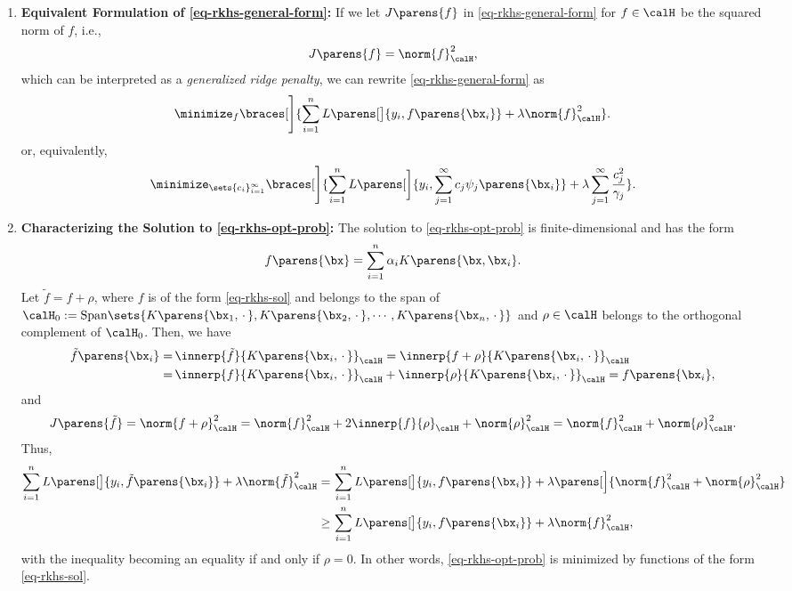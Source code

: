 \documentclass[12pt]{article}
\begin{document}
\begin{enumerate}[label=\textbf{\arabic*.}]
	\item \textbf{Equivalent Formulation of \eqref{eq-rkhs-general-form}:} If we let $J \parens{f}$ in \eqref{eq-rkhs-general-form} for $f \in \calH$ be the squared norm of $f$, i.e., 
	\begin{align*}
		J \parens{f} = \norm{f}_{\calH}^2, 
	\end{align*}
	which can be interpreted as a \textit{generalized ridge penalty}, we can rewrite \eqref{eq-rkhs-general-form} as 
	\begin{align}\label{eq-rkhs-opt-prob}
		\minimize_{f} \braces[\Bigg]{ \sum_{i=1}^n L \parens[\big]{y_i, f \parens{\bx_i}} + \lambda \norm{f}_{\calH}^2 }. 
	\end{align}
	or, equivalently, 
	\begin{align*}
		\minimize_{\sets{ c_i }_{i=1}^\infty } \braces[\Bigg]{ \sum_{i=1}^n L \parens[\bigg]{y_i, \sum_{j=1}^\infty c_j \psi_j \parens{\bx_i}} + \lambda \sum_{j=1}^\infty \frac{c_j^2}{\gamma_j} }. 
	\end{align*}
	
	\item \textbf{Characterizing the Solution to \eqref{eq-rkhs-opt-prob}:} The solution to \eqref{eq-rkhs-opt-prob} is finite-dimensional and has the form 
	\begin{align}\label{eq-rkhs-sol}
		f \parens{\bx} = \sum_{i=1}^n \alpha_i K \parens{\bx, \bx_i}. 
	\end{align}
	Let $\tilde{f} = f + \rho$, where $f$ is of the form \eqref{eq-rkhs-sol} and belongs to the span of $\calH_0 := \mathrm{Span} \sets{K \parens{\bx_1, \,\cdot\,}, K \parens{\bx_2, \,\cdot\,}, \cdots, K \parens{\bx_n, \,\cdot\,}}$ and $\rho \in \calH$ belongs to the orthogonal complement of $\calH_0$. Then, we have 
	\begin{align*}
		\tilde{f} \parens{\bx_i} = & \, \innerp{\tilde{f}}{K \parens{\bx_i, \,\cdot\,}}_{\calH} = \innerp{f + \rho}{K \parens{\bx_i, \,\cdot\,}}_{\calH} \\ 
		= & \, \innerp{f}{K \parens{\bx_i, \,\cdot\,}}_{\calH} + \innerp{\rho}{K \parens{\bx_i, \,\cdot\,}}_{\calH} = f \parens{\bx_i}, 
	\end{align*}
	and 
	\begin{align*}
		J \parens{\tilde{f}} = \norm{f + \rho}_{\calH}^2 = \norm{f}_{\calH}^2 + 2 \innerp{f}{\rho}_{\calH} + \norm{\rho}_{\calH}^2 = \norm{f}_{\calH}^2 + \norm{\rho}_{\calH}^2. 
	\end{align*}
	Thus, 
	\begin{align*}
		\sum_{i=1}^n L \parens[\big]{y_i, \tilde{f} \parens{\bx_i}} + \lambda \norm{\tilde{f}}_{\calH}^2 = & \, \sum_{i=1}^n L \parens[\big]{y_i, f \parens{\bx_i}} + \lambda \parens[\Big]{\norm{f}_{\calH}^2 + \norm{\rho}_{\calH}^2} \\ 
		\ge & \, \sum_{i=1}^n L \parens[\big]{y_i, f \parens{\bx_i}} + \lambda \norm{f}_{\calH}^2, 
	\end{align*}
	with the inequality becoming an equality if and only if $\rho = 0$. In other words, \eqref{eq-rkhs-opt-prob} is minimized by functions of the form \eqref{eq-rkhs-sol}. 
	

\end{enumerate}
\end{document}
